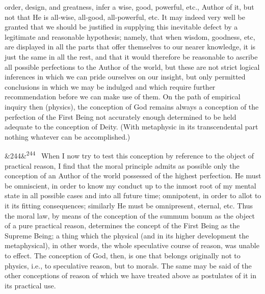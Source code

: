 \documentclass[12pt]{article}
\newcommand{\para}[1][]{\par\noindent\ifx&#1&\else\textsuperscript{\footnotesize #1}~\fi}
\begin{document}
order, design, and greatness, infer a wise, good, powerful, etc., Author of it, but not that He is all-wise, all-good, all-powerful, etc. It may indeed very well be granted that we should be justified in supplying this inevitable defect by a legitimate and reasonable hypothesis; namely, that when wisdom, goodness, etc, are displayed in all the parts that offer themselves to our nearer knowledge, it is just the same in all the rest, and that it would therefore be reasonable to ascribe all possible perfections to the Author of the world, but these are not strict logical inferences in which we can pride ourselves on our insight, but only permitted conclusions in which we may be indulged and which require further recommendation before we can make use of them. On the path of empirical inquiry then (physics), the conception of God remains always a conception of the perfection of the First Being not accurately enough determined to be held adequate to the conception of Deity. (With metaphysic in its transcendental part nothing whatever can be accomplished.)

\para[244] When I now try to test this conception by reference to the object of practical reason, I find that the moral principle admits as possible only the conception of an Author of the world possessed of the highest perfection. He must be omniscient, in order to know my conduct up to the inmost root of my mental state in all possible cases and into all future time; omnipotent, in order to allot to it its fitting consequences; similarly He must be omnipresent, eternal, etc. Thus the moral law, by means of the conception of the summum bonum as the object of a pure practical reason, determines the concept of the First Being as the Supreme Being; a thing which the physical (and in its higher development the metaphysical), in other words, the whole speculative course of reason, was unable to effect. The conception of God, then, is one that belongs originally not to physics, i.e., to speculative reason, but to morals. The same may be said of the other conceptions of reason of which we have treated above as postulates of it in its practical use.
\end{document}
